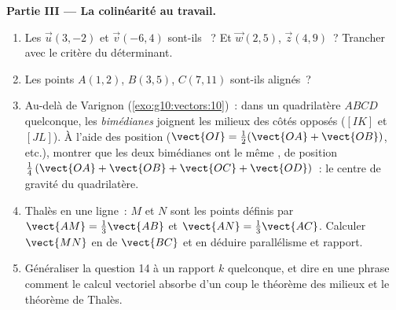 \begin{problem}
\medskip
\noindent\textbf{Partie III --- La colinéarité au travail.}
\begin{enumerate}[resume]
  \item Les  $\vec u(3, -2)$ et $\vec v(-6, 4)$
        sont-ils ~? Et $\vec w(2, 5)$, $\vec z(4, 9)$~?
        Trancher avec le critère du déterminant.
  \item Les points $A(1, 2)$, $B(3, 5)$, $C(7, 11)$ sont-ils
        alignés~?
  \item Au-delà de Varignon (\cref{exo:g10:vectors:10})~: dans un
        quadrilatère $ABCD$ quelconque, les \emph{bimédianes}
        joignent les milieux des côtés opposés ($[IK]$ et $[JL]$).
        À l'aide des  position ($\vect{OI} =
        \frac12(\vect{OA} + \vect{OB})$, etc.), montrer que les deux
        bimédianes ont le même , de  position
        $\frac14\left(\vect{OA} + \vect{OB} + \vect{OC} +
        \vect{OD}\right)$~: le centre de gravité du quadrilatère.
  \item Thalès en une ligne~: $M$ et $N$ sont les points définis par
        $\vect{AM} = \frac13\vect{AB}$ et
        $\vect{AN} = \frac13\vect{AC}$. Calculer $\vect{MN}$ en
         de $\vect{BC}$ et en déduire parallélisme et
        rapport.
  \item Généraliser la question 14 à un rapport $k$ quelconque, et
        dire en une phrase comment le calcul vectoriel absorbe d'un
        coup le théorème des milieux et le théorème de Thalès.
\end{enumerate}


\end{problem}
